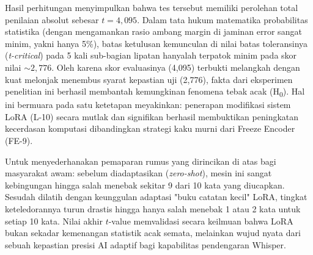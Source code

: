 \vspace{1cm}
Hasil perhitungan menyimpulkan bahwa tes tersebut memiliki perolehan total penilaian absolut sebesar $t = 4,095$. Dalam tata hukum matematika probabilitas statistika (dengan mengamankan rasio ambang margin di jaminan error sangat minim, yakni hanya 5\%), batas ketulusan kemunculan di nilai batas toleransinya (\textit{t-critical}) pada 5 kali sub-bagian lipatan hanyalah terpatok minim pada skor nilai $\sim\!2,776$. Oleh karena skor evaluasinya (4,095) terbukti melangkah dengan kuat melonjak menembus syarat kepastian uji (2,776), fakta dari eksperimen penelitian ini berhasil membantah kemungkinan fenomena tebak acak (H\textsubscript{0}). Hal ini bermuara pada satu ketetapan meyakinkan: penerapan modifikasi sistem LoRA (L-10) secara mutlak dan signifikan berhasil membuktikan peningkatan kecerdasan komputasi dibandingkan strategi kaku murni dari Freeze Encoder (FE-9).

Untuk menyederhanakan pemaparan rumus yang dirincikan di atas bagi masyarakat awam: sebelum diadaptasikan (\textit{zero-shot}), mesin ini sangat kebingungan hingga salah menebak sekitar 9 dari 10 kata yang diucapkan. Sesudah dilatih dengan keunggulan adaptasi "buku catatan kecil" LoRA, tingkat keteledorannya turun drastis hingga hanya salah menebak 1 atau 2 kata untuk setiap 10 kata. Nilai akhir $t$-value memvalidasi secara keilmuan bahwa LoRA bukan sekadar kemenangan statistik acak semata, melainkan wujud nyata dari sebuah kepastian presisi AI adaptif bagi kapabilitas pendengaran Whisper.

